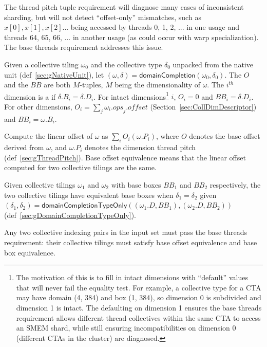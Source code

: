 
The thread pitch tuple requirement will diagnose many cases of inconsistent sharding, but will not detect ``offset-only'' mismatches, such as $x[0], x[1], x[2]...$ being accessed by threads 0, 1, 2, ... in one usage and threads 64, 65, 66, ... in another usage (as could occur with warp specialization).
The base threads requirement addresses this issue.

Given a collective tiling $\omega_0$ and the collective type $\delta_0$ unpacked from the native unit (def~\ref{sec:gNativeUnit}), let $(\omega, \delta) = \mathsf{domainCompletion}(\omega_0, \delta_0)$.
The  $O$ and the  $\textit{BB}$ are both $M$-tuples, $M$ being the dimensionality of $\omega$.
The $i^{th}$ dimension is a  if $\delta.B_i = \delta.D_i$.
For intact dimensions\footnote{The motivation of this is to fill in intact dimensions with ``default'' values that will never fail the equality test.
For example, a collective type for a CTA may have domain (4, 384) and box (1, 384), so dimension 0 is subdivided and dimension 1 is intact.
The defaulting on dimension 1 ensures the base threads requirement allows different thread collectives within the same CTA to access an SMEM shard, while still ensuring incompatibilities on dimension 0 (different CTAs in the cluster) are diagnosed.}
$i$, $O_i = 0$ and $\textit{BB}_i = \delta.D_i$.
For other dimensions, $O_i = \sum_{j} \omega_i.\textit{ops}_j.\textit{offset}$ (Section~\ref{sec:CollDimDescriptor}) and $\textit{BB}_i = \omega.B_i$.

 Compute the linear offset of $\omega$ as $\sum_{i} O_i (\omega.P_i)$, where $O$ denotes the base offset derived from $\omega$, and $\omega.P_i$ denotes the dimension thread pitch (def~\ref{sec:gThreadPitch}).
Base offset equivalence means that the linear offset computed for two collective tilings are the same.

 Given collective tilings $\omega_1$ and $\omega_2$ with base boxes $\textit{BB}_1$ and $\textit{BB}_2$ respectively, the two collective tilings have equivalent base boxes when $\delta_1 = \delta_2$ given $(\delta_1, \delta_2) = \mathsf{domainCompletionTypeOnly}((\omega_1.D, \textit{BB}_1), (\omega_2.D, \textit{BB}_2))$ (def~\ref{sec:gDomainCompletionTypeOnly}).

 Any two collective indexing pairs in the input set must pass the base threads requirement: their collective tilings must satisfy base offset equivalence and base box equivalence.


